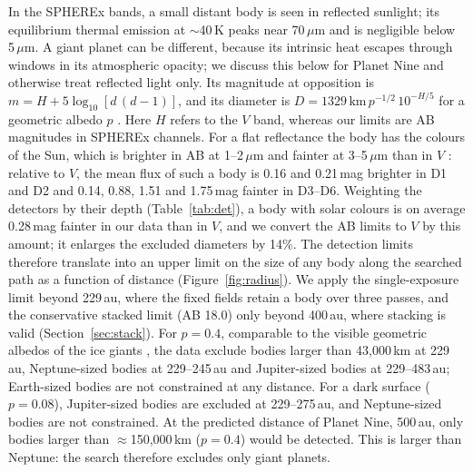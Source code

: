 \documentclass[twocolumn,linenumbers]{aastex702}
\begin{document}
In the SPHEREx bands, a small distant body is seen in reflected sunlight; its equilibrium thermal emission at $\sim$40\,K peaks near 70\,$\mu$m and is negligible below 5\,$\mu$m. A giant planet can be different, because its intrinsic heat escapes through windows in its atmospheric opacity; we discuss this below for Planet Nine and otherwise treat reflected light only. Its magnitude at opposition is $m = H + 5\log_{10}[d\,(d - 1)]$, and its diameter is $D = 1329\,\mathrm{km}\,p^{-1/2}\,10^{-H/5}$ for a geometric albedo $p$ \citep{pravec07}. Here $H$ refers to the $V$ band, whereas our limits are AB magnitudes in SPHEREx channels. For a flat reflectance the body has the colours of the Sun, which is brighter in AB at 1--2\,$\mu$m and fainter at 3--5\,$\mu$m than in $V$ \citep{willmer18}: relative to $V$, the mean flux of such a body is 0.16 and 0.21\,mag brighter in D1 and D2 and 0.14, 0.88, 1.51 and 1.75\,mag fainter in D3--D6. Weighting the detectors by their depth (Table~\ref{tab:det}), a body with solar colours is on average 0.28\,mag fainter in our data than in $V$, and we convert the AB limits to $V$ by this amount; it enlarges the excluded diameters by 14\%. The detection limits therefore translate into an upper limit on the size of any body along the searched path as a function of distance (Figure~\ref{fig:radius}). We apply the single-exposure limit beyond 229\,au, where the fixed fields retain a body over three passes, and the conservative stacked limit (AB 18.0) only beyond 400\,au, where stacking is valid (Section~\ref{sec:stack}). For $p = 0.4$, comparable to the visible geometric albedos of the ice giants \citep{karkoschka94}, the data exclude bodies larger than 43{,}000\,km at 229\,au, Neptune-sized bodies at 229--245\,au and Jupiter-sized bodies at 229--483\,au; Earth-sized bodies are not constrained at any distance. For a dark surface ($p = 0.08$), Jupiter-sized bodies are excluded at 229--275\,au, and Neptune-sized bodies are not constrained. At the predicted distance of Planet Nine, 500\,au, only bodies larger than $\approx$150{,}000\,km ($p = 0.4$) would be detected. This is larger than Neptune: the search therefore excludes only giant planets.
\end{document}
